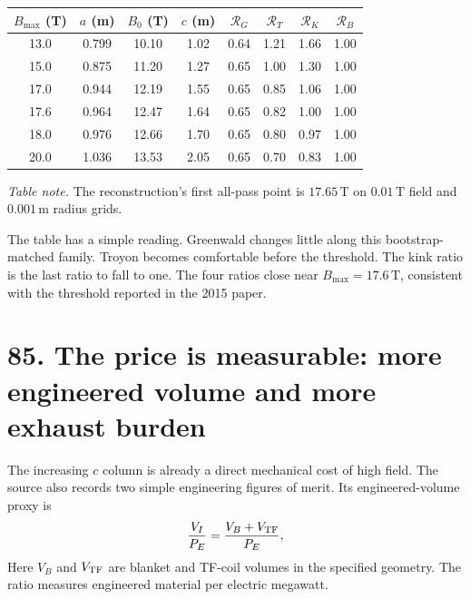 \documentclass[11pt]{article}
\begin{document}
\par\noindent\begin{minipage}{\linewidth}
\begin{center}
\begin{tabular}{c c c c c c c c}
$B_{\max}$ (T) & $a$ (m) & $B_0$ (T) & $c$ (m) & $\mathcal R_G$
& $\mathcal R_T$ & $\mathcal R_K$ & $\mathcal R_B$\\
\hline
13.0 & 0.799 & 10.10 & 1.02 & 0.64 & 1.21 & 1.66 & 1.00\\
15.0 & 0.875 & 11.20 & 1.27 & 0.65 & 1.00 & 1.30 & 1.00\\
17.0 & 0.944 & 12.19 & 1.55 & 0.65 & 0.85 & 1.06 & 1.00\\
17.6 & 0.964 & 12.47 & 1.64 & 0.65 & 0.82 & 1.00 & 1.00\\
18.0 & 0.976 & 12.66 & 1.70 & 0.65 & 0.80 & 0.97 & 1.00\\
20.0 & 1.036 & 13.53 & 2.05 & 0.65 & 0.70 & 0.83 & 1.00
\end{tabular}
\end{center}
{\small\textit{Table note.} The reconstruction's first all-pass point is
$17.65\,\mathrm T$ on $0.01\,\mathrm T$ field and $0.001\,\mathrm m$ radius grids.\par}
\end{minipage}\par


The table has a simple reading. Greenwald changes little along this
bootstrap-matched family. Troyon becomes comfortable before the threshold. The kink
ratio is the last ratio to fall to one. The four ratios close near $B_{\max}=17.6\,\mathrm T$, consistent with the
threshold reported in the 2015 paper.


\section*{85. The price is measurable: more engineered volume and more exhaust burden}

The increasing $c$ column is already a direct mechanical cost of high field. The
source also records two simple engineering figures of merit. Its engineered-volume
proxy is
\begin{equation}
 \frac{V_I}{P_E}=\frac{V_B+V_{\rm TF}}{P_E},
 \label{eq:freidberg-cost-proxy}
\end{equation}
Here $V_B$ and $V_{\rm TF}$ are blanket and TF-coil volumes in the specified geometry.
The ratio measures engineered material per electric megawatt.
\end{document}
